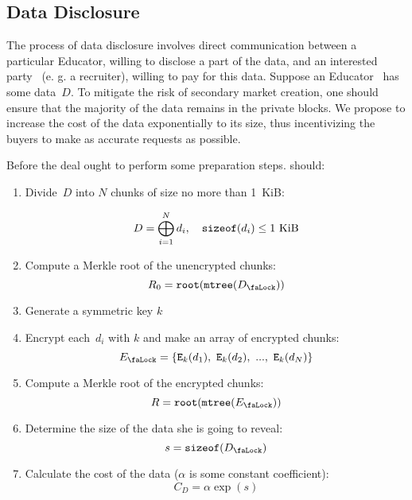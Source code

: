 \subsection{Data Disclosure}
\label{sec:DataDisclosure}
The process of data disclosure involves direct communication between a particular Educator, willing to disclose a part of the data, and an interested party~ (e. g. a recruiter), willing to pay for this data. Suppose an Educator~ has some data~$D$. To mitigate the risk of secondary market creation, one should ensure that the majority of the data remains in the private blocks. We propose to increase the cost of the data exponentially to its size, thus incentivizing the buyers to make as accurate requests as possible.

 Before the deal  ought to perform some preparation steps.  should:
\begin{enumerate}
\item Divide~$D$ into $N$ chunks of size no more than 1~KiB:

\begin{equation}
D = \bigoplus_{i=1}^N d_i, \quad \mathtt{sizeof}(d_i) \leq 1~\mathrm{KiB}
\end{equation}

\item Compute a Merkle root of the unencrypted chunks:
\begin{equation}
R_0 = \Root(\MerkleTree(\Lock{D}))
\end{equation}

\item Generate a symmetric key $k$
\item Encrypt each~$d_i$ with $k$ and make an array of encrypted chunks:
\begin{equation}
\Lock{E} = \{ \Encrypt_\Key{k}(d_1),\ \Encrypt_\Key{k}(d_2),\ ...,\ \Encrypt_\Key{k}(d_N) \}
\end{equation}

\item Compute a Merkle root of the encrypted chunks:
\begin{equation}
R = \Root(\MerkleTree(\Lock{E}))
\end{equation}

\item Determine the size of the data she is going to reveal:
\begin{equation}
s = \SizeOf(\Lock{D})
\end{equation}

\item Calculate the cost of the data ($\alpha$ is some constant coefficient):
\begin{equation}
C_D = \alpha \operatorname{exp}(s)
\end{equation}
\end{enumerate}

